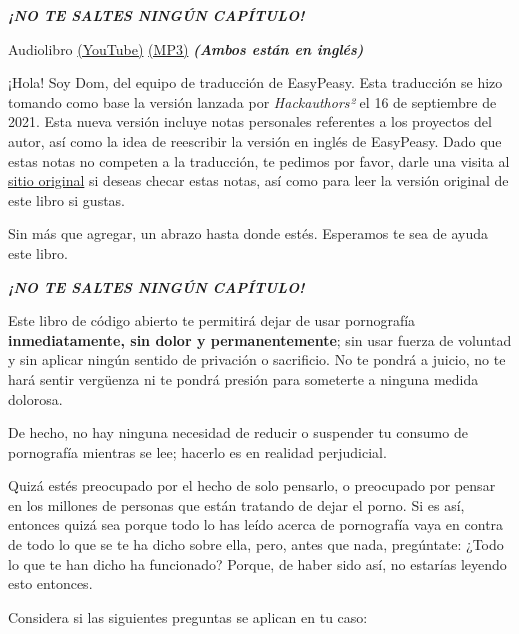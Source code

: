 \documentclass[
]{book}
\begin{document}
{\emph{\textbf{¡NO TE SALTES NINGÚN CAPÍTULO!}}}

Audiolibro \href{https://www.youtube.com/watch?v=ZktxO6adTnI}{(YouTube)} \href{https://onedrive.live.com/?authkey=\%21AKIwfnK6Sjchng8\&cid=3961F5C89581C375\&id=3961F5C89581C375\%21256774\&parId=3961F5C89581C375\%21256773\&o=OneUp\&sw=bypassConfig}{(MP3)} \emph{\textbf{(Ambos están en inglés)}}

¡Hola! Soy Dom, del equipo de traducción de EasyPeasy. Esta traducción se hizo tomando como base la versión lanzada por \emph{Hackauthors²} el 16 de septiembre de 2021. Esta nueva versión incluye notas personales referentes a los proyectos del autor, así como la idea de reescribir la versión en inglés de EasyPeasy. Dado que estas notas no competen a la traducción, te pedimos por favor, darle una visita al \href{https://easypeasymethod.org/}{sitio original} si deseas checar estas notas, así como para leer la versión original de este libro si gustas.

Sin más que agregar, un abrazo hasta donde estés. Esperamos te sea de ayuda este libro.

{\emph{\textbf{¡NO TE SALTES NINGÚN CAPÍTULO!}}}

Este libro de código abierto te permitirá dejar de usar pornografía \textbf{inmediatamente, sin dolor y permanentemente}; sin usar fuerza de voluntad y sin aplicar ningún sentido de privación o sacrificio. No te pondrá a juicio, no te hará sentir vergüenza ni te pondrá presión para someterte a ninguna medida dolorosa.

De hecho, no hay ninguna necesidad de reducir o suspender tu consumo de pornografía mientras se lee; hacerlo es en realidad perjudicial.

Quizá estés preocupado por el hecho de solo pensarlo, o preocupado por pensar en los millones de personas que están tratando de dejar el porno. Si es así, entonces quizá sea porque todo lo has leído acerca de pornografía vaya en contra de todo lo que se te ha dicho sobre ella, pero, antes que nada, pregúntate: ¿Todo lo que te han dicho ha funcionado? Porque, de haber sido así, no estarías leyendo esto entonces.

Considera si las siguientes preguntas se aplican en tu caso:
\end{document}
